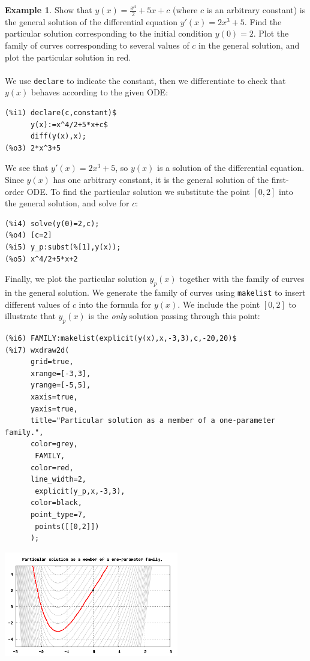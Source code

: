 \documentclass[10.5pt,twoside]{report}
\theoremstyle{definition}
\newtheorem{exmp}{Example}[section]
\begin{document}
\begin{exmp} Show that $y(x)=\frac{x^4}{2}+5x+c$ (where $c$ is an arbitrary constant) is the general solution of the differential equation $y'(x)=2x^3+5$.  Find the particular solution corresponding to the initial condition $y(0)=2$.  Plot the family of curves corresponding to several values of $c$ in the general solution, and plot the particular solution in red.\\
${}$\\

We use \verb|declare| to indicate the constant, then we differentiate to check that $y(x)$ behaves according to the given ODE:

\begin{verbatim}
(%i1) declare(c,constant)$
      y(x):=x^4/2+5*x+c$
      diff(y(x),x);
(%o3) 2*x^3+5
\end{verbatim}

We see that $y'(x)=2x^3+5$, so $y(x)$ is a solution of the differential equation.  Since $y(x)$ has one arbitrary constant, it is the general solution of the first-order ODE.  To find the particular solution we substitute the point $[0,2]$ into the general solution, and solve for $c$:

\begin{verbatim}
(%i4) solve(y(0)=2,c);
(%o4) [c=2]
(%i5) y_p:subst(%[1],y(x));
(%o5) x^4/2+5*x+2
\end{verbatim}

Finally, we plot the particular solution $y_p(x)$ together with the family of curves in the general solution.  We generate the family of curves using \verb|makelist| to insert different values of $c$ into the formula for $y(x)$.  We include the point $[0,2]$ to illustrate that $y_p(x)$ is the \textit{only} solution passing through this point:

\begin{verbatim}
(%i6) FAMILY:makelist(explicit(y(x),x,-3,3),c,-20,20)$
(%i7) wxdraw2d(
      grid=true,
      xrange=[-3,3],
      yrange=[-5,5],
      xaxis=true,
      yaxis=true,
      title="Particular solution as a member of a one-parameter family.",
      color=grey,
       FAMILY,
      color=red,
      line_width=2,
       explicit(y_p,x,-3,3),
      color=black,
      point_type=7,
       points([[0,2]])
      );
\end{verbatim}

\includegraphics[width=3in]{example_4_1_1_1}

\end{exmp}
\end{document}
